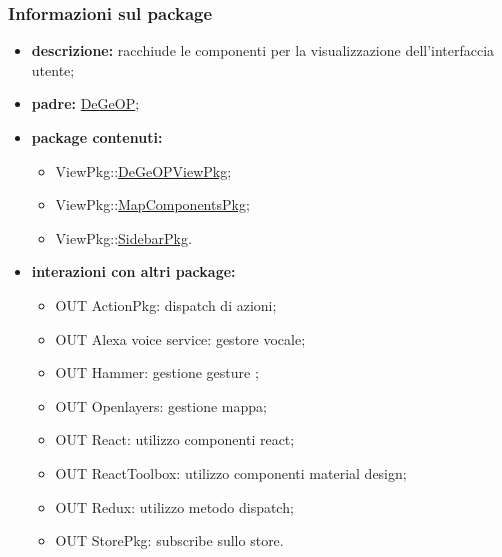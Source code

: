 \subsubsection{Informazioni sul package}
\begin{itemize}
	\item \textbf{descrizione:} racchiude le componenti per la visualizzazione dell'interfaccia utente;
	\item \textbf{padre:} \hyperref[pkg::DeGeOP]{DeGeOP};
	\item \textbf{package contenuti:}
	\begin{itemize}
		\item ViewPkg::\hyperref[pkg::DeGeOPViewPkg]{DeGeOPViewPkg};
		\item ViewPkg::\hyperref[pkg::MapComponentsPkg]{MapComponentsPkg};
		\item ViewPkg::\hyperref[pkg::SidebarPkg]{SidebarPkg}.
	\end{itemize}
	\item \textbf{interazioni con altri package:} 
	\begin{itemize}
		\item OUT ActionPkg: dispatch di azioni;
		\item OUT Alexa voice service: gestore vocale;
		\item OUT Hammer: gestione gesture ;
		\item OUT Openlayers: gestione mappa;
		\item OUT React: utilizzo componenti react;
		\item OUT ReactToolbox: utilizzo componenti material design;
		\item OUT Redux: utilizzo metodo dispatch;
		\item OUT StorePkg: subscribe sullo store.
	\end{itemize}
\end{itemize}
\newpage
